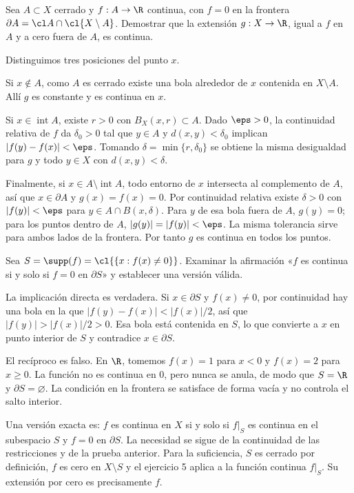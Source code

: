 \begin{ejercicio}
Sea $A\subset X$ cerrado y $f:A\to\R$ continua, con $f=0$ en la frontera $\partial A=\cl A\cap\cl{X\setminus A}$. Demostrar que la extensión $g:X\to\R$, igual a $f$ en $A$ y a cero fuera de $A$, es continua.
\end{ejercicio}
\begin{solucion}
Distinguimos tres posiciones del punto $x$.

Si $x\notin A$, como $A$ es cerrado existe una bola alrededor de $x$ contenida en $X\setminus A$. Allí $g$ es constante y es continua en $x$.

Si $x\in\operatorname{int}A$, existe $r>0$ con $B_X(x,r)\subset A$. Dado $\eps>0$, la continuidad relativa de $f$ da $\delta_0>0$ tal que $y\in A$ y $d(x,y)<\delta_0$ implican $|f(y)-f(x)|<\eps$. Tomando $\delta=\min\{r,\delta_0\}$ se obtiene la misma desigualdad para $g$ y todo $y\in X$ con $d(x,y)<\delta$.

Finalmente, si $x\in A\setminus\operatorname{int}A$, todo entorno de $x$ intersecta al complemento de $A$, así que $x\in\partial A$ y $g(x)=f(x)=0$. Por continuidad relativa existe $\delta>0$ con $|f(y)|<\eps$ para $y\in A\cap B(x,\delta)$. Para $y$ de esa bola fuera de $A$, $g(y)=0$; para los puntos dentro de $A$, $|g(y)|=|f(y)|<\eps$. La misma tolerancia sirve para ambos lados de la frontera. Por tanto $g$ es continua en todos los puntos.
\end{solucion}

\begin{ejercicio}
Sea $S=\supp(f)=\cl{\{x:f(x)\ne0\}}$. Examinar la afirmación «$f$ es continua si y solo si $f=0$ en $\partial S$» y establecer una versión válida.
\end{ejercicio}
\begin{solucion}
La implicación directa es verdadera. Si $x\in\partial S$ y $f(x)\ne0$, por continuidad hay una bola en la que $|f(y)-f(x)|<|f(x)|/2$, así que $|f(y)|>|f(x)|/2>0$. Esa bola está contenida en $S$, lo que convierte a $x$ en punto interior de $S$ y contradice $x\in\partial S$.

El recíproco es falso. En $\R$, tomemos $f(x)=1$ para $x<0$ y $f(x)=2$ para $x\ge0$. La función no es continua en $0$, pero nunca se anula, de modo que $S=\R$ y $\partial S=\varnothing$. La condición en la frontera se satisface de forma vacía y no controla el salto interior.

Una versión exacta es: $f$ es continua en $X$ si y solo si $f|_S$ es continua en el subespacio $S$ y $f=0$ en $\partial S$. La necesidad se sigue de la continuidad de las restricciones y de la prueba anterior. Para la suficiencia, $S$ es cerrado por definición, $f$ es cero en $X\setminus S$ y el ejercicio 5 aplica a la función continua $f|_S$. Su extensión por cero es precisamente $f$.
\end{solucion}

